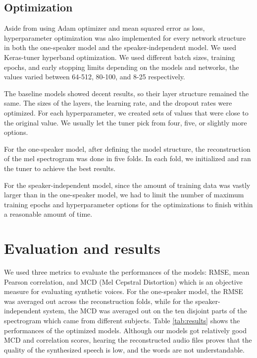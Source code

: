 \documentclass{article}
\begin{document}
\subsection{Optimization}

Aside from using Adam optimizer and mean squared error as loss, hyperparameter optimization was also implemented for every network structure in both the one-speaker model and the speaker-independent model. We used Keras-tuner hyperband optimization. We used different batch sizes, training epochs, and early stopping limits depending on the models and networks, the values varied between 64-512, 80-100, and 8-25 respectively. 

The baseline models showed decent results, so their layer structure remained the same. The sizes of the layers, the learning rate, and the dropout rates were optimized. For each hyperparameter, we created sets of values that were close to the original value. We usually let the tuner pick from four, five, or slightly more options.

For the one-speaker model, after defining the model structure, the reconstruction of the mel spectrogram was done in five folds. In each fold, we initialized and ran the tuner to achieve the best results.

For the speaker-independent model, since the amount of training data was vastly larger than in the one-speaker model, we had to limit the number of maximum training epochs and hyperparameter options for the optimizations to finish within a reasonable amount of time.

\section{Evaluation and results}

We used three metrics to evaluate the performances of the models: RMSE, mean Pearson correlation, and MCD (Mel Cepstral Distortion) which is an objective measure for evaluating synthetic voices. For the one-speaker model, the RMSE was averaged out across the reconstruction folds, while for the speaker-independent system, the MCD was averaged out on the ten disjoint parts of the spectrogram which came from different subjects. Table \ref{tab:results} shows the performances of the optimized models. Although our models got relatively good MCD and correlation scores, hearing the reconstructed audio files proves that the quality of the synthesized speech is low, and the words are not understandable.
\end{document}
